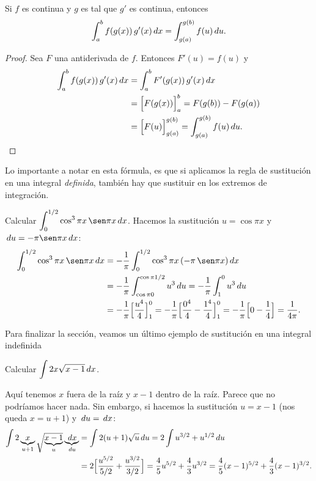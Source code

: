 \begin{theorem} 
  Si $f$ es continua y $g$ es tal que $g'$ es continua, entonces
  \[
  \int_a^b f(g(x))\, g'(x)\,dx = \int_{g(a)}^{g(b)} f(u)\,du.
  \]
\end{theorem}

\begin{proof}
  Sea $F$ una antiderivada de $f$. Entonces $F'(u)=f(u)$ y 
  \begin{align*}
    \int_a^b f(g(x))\, g'(x)\,dx 
    &= \int_a^b F'(g(x))\, g'(x)\,dx \\
    &= \Big[ F(g(x))\Big]_a^b = F(g(b))-F(g(a)) 
    \\
    &= \Big[ F(u)\Big]_{g(a)}^{g(b)} = \int_{g(a)}^{g(b)} f(u) \,du. 
    \qedhere
  \end{align*}
\end{proof}

Lo importante a notar en esta fórmula, es que si aplicamos la regla de sustitución en una integral \emph{definida}, también hay que sustituir en los extremos de integración.

\begin{example}
  Calcular $\D\int_0^{1/2} \cos^3 \pi x\,\sen\pi x\dx$.
  Hacemos la sustitución $u=\cos\pi x$ y $\du = -\pi \sen\pi x \dx$:
  \begin{align*}
    \int_0^{1/2} \cos^3 \pi x\,\sen\pi x\dx 
    &= -\frac1\pi \int_0^{1/2} \cos^3 \pi x\,(-\pi\,\sen\pi x)\dx \\
    &= -\frac1\pi \int_{\cos \pi 0}^{\cos \pi 1/2} u^3 \du 
    = -\frac1\pi \int_{1}^{0} u^3 \du \\
    &= -\frac1\pi  \Big[\frac{u^4}{4}\Big]_{1}^{0} 
    = -\frac1\pi  \Big[\frac{0^4}{4}-\frac{1^4}{4}\Big]_{1}^{0} 
    = -\frac1\pi  \Big[0-\frac{1}{4}\Big]
    = \frac{1}{4\pi}.
  \end{align*}
\end{example}

Para finalizar la sección, veamos un último ejemplo de sustitución en una integral indefinida 

\begin{example}
  Calcular $\displaystyle\int 2x \sqrt{x-1}\,dx$.

  Aquí tenemos $x$ fuera de la raíz y $x-1$ dentro de la raíz. Parece que no podríamos hacer nada. Sin embargo, si hacemos la sustitución $u=x-1$ (nos queda $x=u+1$) y $\,du = \,dx$:
  \begin{align*}
    \int 2\underbrace{x}_{u+1} \sqrt{\underbrace{x-1}_u}\underbrace{\,dx}_{\,du}
    &= \int 2 (u+1)\sqrt{u}\,du = 2 \int u^{3/2}+u^{1/2}\,du
    \\
    &= 2\Big[ \frac{u^{5/2}}{5/2} + \frac{u^{3/2}}{3/2}\Big]
    = \frac45 u^{5/2} + \frac43 u^{3/2}
    =  \frac45 (x-1)^{5/2} + \frac43 (x-1)^{3/2}.
  \end{align*}
\end{example}

